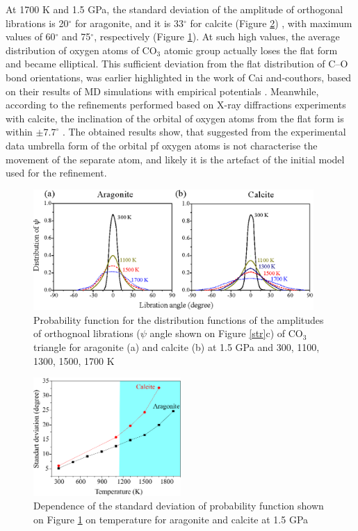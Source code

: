 \documentclass[journal=jacsat,manuscript=article]{achemso}
\begin{document}
 At 1700 K and 1.5 GPa, the standard deviation of the amplitude of orthogonal librations is 20$^{\circ}$ for aragonite, and it is 33$^{\circ}$ for calcite (Figure \ref{libr15_d}) , with maximum values of 60$^{\circ}$ and 75$^{\circ}$, respectively (Figure \ref{libr15}). 
 At such high values, the average distribution of oxygen atoms of CO$_3$ atomic group actually loses the flat form and became elliptical.
This sufficient deviation from the flat distribution of C--O bond orientations, was earlier highlighted in the work of Cai and-couthors, based on their results of MD simulations with empirical potentials \cite{cai2020}.
Meanwhile, according to the refinements performed based on X-ray diffractions experiments with calcite, the inclination of the orbital of oxygen atoms from the flat form is within $\pm 7.7^\circ$  \cite{ishizawa2013}.
The obtained results show, that suggested from the experimental data umbrella form of the orbital pf oxygen atoms is not characterise the movement of the separate atom, and likely it is the artefact of the initial model used for the refinement.


\begin{figure}[H]
\includegraphics[width=0.95\textwidth]{libr15} \centering
\caption{Probability function for the distribution functions of the amplitudes of orthognoal librations  ($\psi$  angle shown on Figure \ref{str}c) of CO$_3$ triangle for aragonite (a) and calcite (b) at 1.5 GPa and 300, 1100, 1300, 1500, 1700 K} \label{libr15}
\end{figure}

\begin{figure}[H]
\includegraphics[width=0.5\textwidth]{libr15_d} \centering
\caption{Dependence of the standard deviation of probability function shown on Figure \ref{libr15} on temperature  for aragonite and calcite at 1.5 GPa} \label{libr15_d}
\end{figure}
\end{document}

